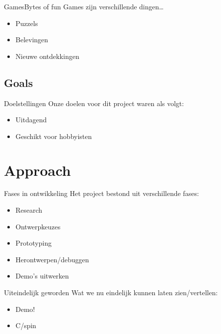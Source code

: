 \documentclass{beamer}
\begin{document}
\begin{frame}{Games}{Bytes of fun}
	Games zijn verschillende dingen\dots
	\pause
	\begin{itemize}
		\item
			Puzzels
			\pause
		\item
			Belevingen
			\pause
		\item
			Nieuwe ontdekkingen
	\end{itemize}
\end{frame}

\subsection{Goals}

\begin{frame}{Doelstellingen}
	Onze doelen voor dit project waren als volgt:
	\begin{itemize}
		\pause
		\item
			Uitdagend
			\pause
		\item
			Geschikt voor hobbyisten
	\end{itemize}
\end{frame}

\section{Approach}

\begin{frame}{Fases in ontwikkeling}
	Het project bestond uit verschillende fases:
	\begin{itemize}
		\item
			Research
			\pause
		\item
			Ontwerpkeuzes
			\pause
		\item
			Prototyping
			\pause
		\item
			Herontwerpen/debuggen
			\pause
		\item
			Demo's uitwerken
	\end{itemize}
\end{frame}

\begin{frame}{Uiteindelijk geworden}
	Wat we nu eindelijk kunnen laten zien/vertellen:
	\begin{itemize}
		\item
			Demo!
			\pause
		\item
			C/spin
	\end{itemize}
\end{frame}
\end{document}

